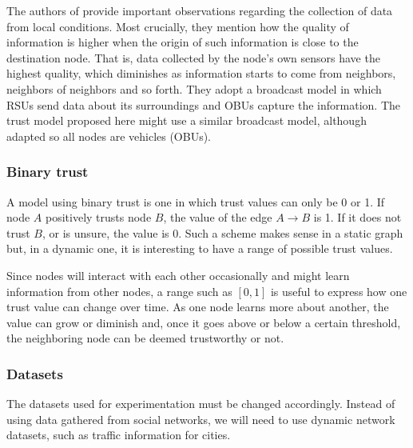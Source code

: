 \documentclass{article}
\begin{document}
The authors of \cite{patwardhan2006data} provide important observations regarding the collection of data from local conditions.
Most crucially, they mention how the quality of information is higher when the origin of such information is close to the destination node.
That is, data collected by the node's own sensors have the highest quality, which diminishes as information starts to come from neighbors, neighbors of neighbors and so forth.
They adopt a broadcast model in which RSUs send data about its surroundings and OBUs capture the information.
The trust model proposed here might use a similar broadcast model, although adapted so all nodes are vehicles (OBUs).

\subsubsection{Binary trust}
A model using binary trust is one in which trust values can only be 0 or 1.
If node $A$ positively trusts node $B$, the value of the edge $A\rightarrow B$ is 1.
If it does not trust $B$, or is unsure, the value is 0.
Such a scheme makes sense in a static graph but, in a dynamic one, it is interesting to have a range of possible trust values.

Since nodes will interact with each other occasionally and might learn information from other nodes, a range such as $[0,1]$ is useful to express how one trust value can change over time.
As one node learns more about another, the value can grow or diminish and, once it goes above or below a certain threshold, the neighboring node can be deemed trustworthy or not.

\subsubsection{Datasets}
The datasets used for experimentation must be changed accordingly.
Instead of using data gathered from social networks, we will need to use dynamic network datasets, such as traffic information for cities.








 
\end{document}
